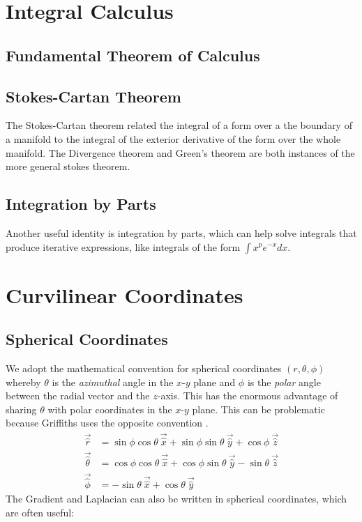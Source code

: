 \section{Integral Calculus}
\subsection{Fundamental Theorem of Calculus}

\subsection{Stokes-Cartan Theorem}
The Stokes-Cartan theorem related the integral of a form over a the boundary of a manifold to the integral of the exterior derivative of the form over the whole manifold. The Divergence theorem and Green's theorem are both instances of the more general stokes theorem.

\subsection{Integration by Parts}
Another useful identity is integration by parts, which can help solve integrals that produce iterative expressions, like integrals of the form $\int x^p e^{-x} dx$.

\section{Curvilinear Coordinates}
\subsection{Spherical Coordinates}
We adopt the mathematical convention for spherical coordinates $(r, \theta, \phi)$ whereby $\theta$ is the \textit{azimuthal} angle in the $x$-$y$ plane and $\phi$ is the \textit{polar} angle between the radial vector and the $z$-axis. This has the enormous advantage of sharing $\theta$ with polar coordinates in the $x$-$y$ plane. This can be problematic because Griffiths uses the opposite convention \cite{griffithsIntroductionElectrodynamics2018}.
\begin{align}
	\vec{\hat{r}} &= \sin\phi\cos\theta\ \vec{\hat{x}} + \sin\phi\sin\theta\ \vec{\hat{y}} + \cos\phi\ \vec{\hat{z}} \\
	\vec{\hat{\theta}} &= \cos\phi\cos\theta\ \vec{\hat{x}} + \cos\phi\sin\theta\ \vec{\hat{y}} - \sin\theta\ \vec{\hat{z}} \\
	\vec{\hat{\phi}} &= - \sin\theta\ \vec{\hat{x}} + \cos\theta\ \vec{\hat{y}}
\end{align}
The Gradient and Laplacian can also be written in spherical coordinates, which are often useful:

